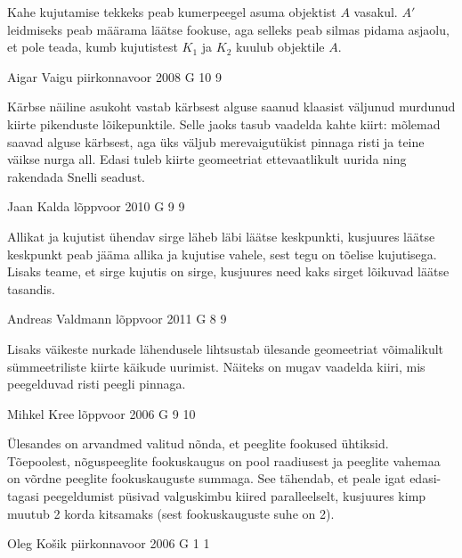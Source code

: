 \documentclass[11pt]{article}
\begin{document}
{{\ifHint
Kahe kujutamise tekkeks peab kumerpeegel asuma objektist $A$ vasakul. $A'$ leidmiseks peab määrama läätse fookuse, aga selleks peab silmas pidama asjaolu, et pole teada, kumb kujutistest $K_1$ ja $K_2$ kuulub objektile $A$.
\fi
}

{Aigar Vaigu} %
{piirkonnavoor} %
{2008} %
{G 10} %
{9} %
{

\ifHint
Kärbse näiline asukoht vastab kärbsest alguse saanud klaasist väljunud murdunud kiirte pikenduste lõikepunktile. Selle jaoks tasub vaadelda kahte kiirt: mõlemad saavad alguse kärbsest, aga üks väljub merevaigutükist pinnaga risti ja teine väikse nurga all. Edasi tuleb kiirte geomeetriat ettevaatlikult uurida ning rakendada Snelli seadust.
\fi
}

{Jaan Kalda} %
{lõppvoor} %
{2010} %
{G 9} %
{9} %
{

\ifHint
Allikat ja kujutist ühendav sirge läheb läbi läätse keskpunkti, kusjuures läätse keskpunkt peab jääma allika ja kujutise vahele, sest tegu on tõelise kujutisega. Lisaks teame, et sirge kujutis on sirge, kusjuures need kaks sirget lõikuvad läätse tasandis.
\fi
}

{Andreas Valdmann} %
{lõppvoor} %
{2011} %
{G 8} %
{9} %
{

\ifHint
Lisaks väikeste nurkade lähendusele lihtsustab ülesande geomeetriat võimalikult sümmeetriliste kiirte käikude uurimist. Näiteks on mugav vaadelda kiiri, mis peegelduvad risti peegli pinnaga.
\fi
}

{Mihkel Kree} %
{lõppvoor} %
{2006} %
{G 9} %
{10} %
{

\ifHint
Ülesandes on arvandmed valitud nõnda, et peeglite fookused ühtiksid. Tõepoolest, nõguspeeglite fookuskaugus on pool raadiusest ja peeglite vahemaa on võrdne peeglite fookuskauguste summaga. See tähendab, et peale igat edasi-tagasi peegeldumist püsivad valguskimbu kiired paralleelselt, kusjuures kimp muutub 2 korda kitsamaks (sest fookuskauguste suhe on 2).
\fi
}

{Oleg Košik} %
{piirkonnavoor} %
{2006} %
{G 1} %
{1} %
{

}}
\end{document}
